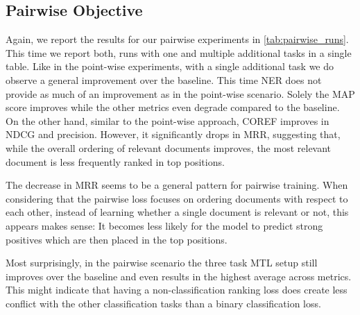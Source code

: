 \subsection{Pairwise Objective}
Again, we report the results for our pairwise experiments in \autoref{tab:pairwise_runs}. This time we report both, runs with one and multiple additional tasks in a single table. Like in the point-wise experiments, with a single additional task we do observe a general improvement over the baseline. This time NER does not provide as much of an improvement as in the point-wise scenario. Solely the MAP score improves while the other metrics even degrade compared to the baseline. On the other hand, similar to the point-wise approach, COREF improves in NDCG and precision. However, it significantly drops in MRR, suggesting that, while the overall ordering of relevant documents improves, the most relevant document is less frequently ranked in top positions.

The decrease in MRR seems to be a general pattern for pairwise training. When considering that the pairwise loss focuses on ordering documents with respect to each other, instead of learning whether a single document is relevant or not, this appears makes sense: It becomes less likely for the model to predict strong positives which are then placed in the top positions.

Most surprisingly, in the pairwise scenario the three task MTL setup still improves over the baseline and even results in the highest average across metrics. This might indicate that having a non-classification ranking loss does create less conflict with the other classification tasks than a binary classification loss.

